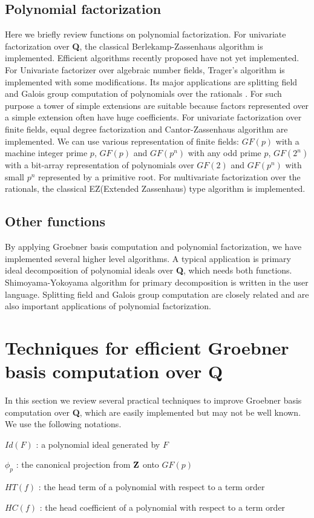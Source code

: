 \documentclass[runningheads]{cl2emult}
\begin{document}
\subsection{Polynomial factorization}

Here we briefly review functions on polynomial factorization.  For
univariate factorization over {\bf Q}, the classical
Berlekamp-Zassenhaus algorithm is implemented.  Efficient algorithms
recently proposed have not yet implemented.  For Univariate factorizer
over algebraic number fields, Trager's algorithm \cite{TRAGER} is
implemented with some modifications.  Its major applications are
splitting field and Galois group computation of polynomials over the
rationals \cite{ANY}. For such purpose a tower of simple extensions
are suitable because factors represented over a simple extension often
have huge coefficients.  For univariate factorization over finite
fields, equal degree factorization and Cantor-Zassenhaus algorithm are
implemented. We can use various representation of finite fields:
$GF(p)$ with a machine integer prime $p$, $GF(p)$ and $GF(p^n)$ with
any odd prime $p$, $GF(2^n)$ with a bit-array representation of
polynomials over $GF(2)$ and $GF(p^n)$ with small $p^n$ represented by
a primitive root.  For multivariate factorization over the rationals,
the classical EZ(Extended Zassenhaus) type algorithm is implemented.

\subsection{Other functions}
By applying Groebner basis computation and polynomial factorization,
we have implemented several higher level algorithms. A typical
application is primary ideal decomposition of polynomial ideals over
{\bf Q}, which needs both functions.  Shimoyama-Yokoyama algorithm
\cite{SY} for primary decomposition is written in the user language.
Splitting field and Galois group computation \cite{ANY} are closely
related and are also important applications of polynomial
factorization.

\section{Techniques for efficient Groebner basis computation over {\bf Q}}
\label{gbtech}

In this section we review several practical techniques to improve
Groebner basis computation over {\bf Q}, which are easily
implemented but may not be well known.
We use the following notations.
\begin{description}
\item $Id(F)$ : a polynomial ideal generated by $F$
\item $\phi_p$ : the canonical projection from ${\bf Z}$ onto $GF(p)$
\item $HT(f)$ : the head term of a polynomial with respect to a term order
\item $HC(f)$ : the head coefficient of a polynomial with respect to a term order
\end{description}
\end{document}
